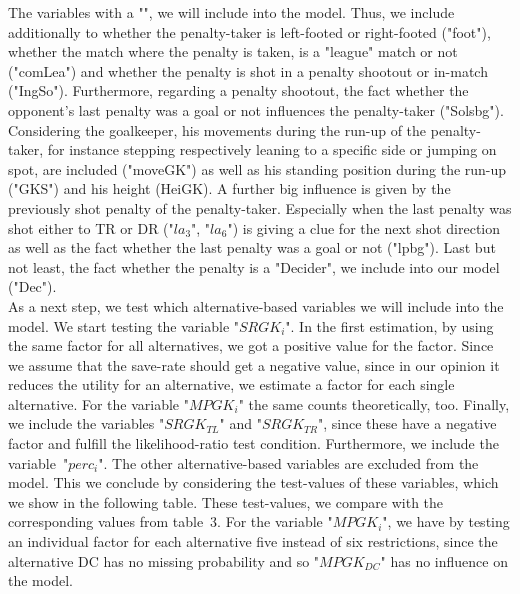 \documentclass[12pt,dvipsnames]{article}%
\begin{document}
 The variables with a "\checkmark ", we will include into the model. Thus, we include additionally to whether the penalty-taker is left-footed or right-footed ("foot"), whether the match where the penalty is taken, is a "league" match or not ("comLea") and whether the penalty is shot in a penalty shootout or in-match ("IngSo"). Furthermore, regarding a penalty shootout, the fact whether the opponent's last penalty was a goal or not influences the penalty-taker ("Solsbg"). Considering the goalkeeper, his movements during the run-up of the penalty-taker, for instance stepping respectively leaning to a specific side or jumping on spot, are included ("moveGK") as well as his standing position during the run-up ("GKS") and his height (HeiGK). A further big influence is given by the previously shot penalty of the penalty-taker. Especially when the last penalty was shot either to TR or DR ("$la_{3}$", "$la_{6}$") is giving a clue for the next shot direction as well as the fact whether the last penalty was a goal or not ("lpbg"). Last but not least, the fact whether the penalty is a "Decider", we include into our model ("Dec"). \\
%
As a next step, we test which alternative-based variables we will include into the model. We start testing the variable "$SRGK_i$". In the first estimation, by using the same factor for all alternatives, we got a positive value for the factor. Since we assume that the save-rate should get a negative value, since in our opinion it reduces the utility for an alternative, we estimate a factor for each single alternative. For the variable "$MPGK_i$" the same counts theoretically, too. Finally, we include the variables "$SRGK_{TL}$" and "$SRGK_{TR}$", since these have a negative factor and fulfill the likelihood-ratio test condition. Furthermore, we include the \mbox{variable "$perc_i$"}. The other alternative-based variables are excluded from the model. This we conclude by considering the test-values of these variables, which we show in the following table. These test-values, we compare with the corresponding values from \mbox{table 3}. For the variable "$MPGK_i$", we have by testing an individual factor for each alternative five instead of six restrictions, since the alternative DC has no missing probability and so "$MPGK_{DC}$" has no influence on the model. 

\vspace{+0.2cm}
 
\end{document}
